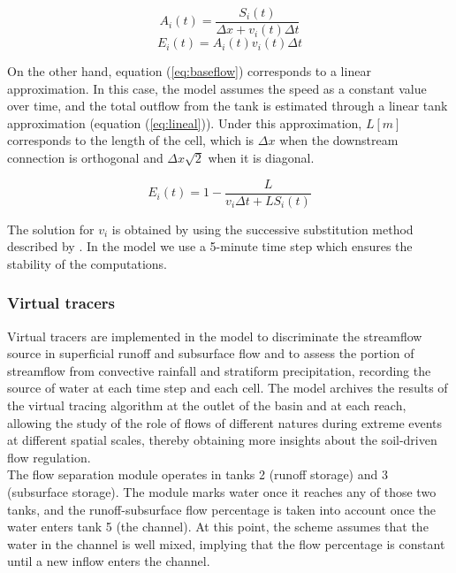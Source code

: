 \documentclass[hess, manuscript]{copernicus}
\begin{document}
\begin{equation}
 A_i(t) = \frac{S_{i}(t)}{\Delta x + v_{i}(t) \Delta t}
    \label{eq:balance}
\end{equation}
\begin{equation}
    E_{i}(t) =  A_{i}(t) v_{i}(t) \Delta t
     \label{eq:volSalida}
\end{equation}

On the other hand, equation (\ref{eq:baseflow}) corresponds to a linear approximation.  In this case, the model assumes the speed as a constant value over time, and the total outflow from the tank is estimated through a linear tank approximation (equation (\ref{eq:lineal})). Under this approximation, $L [m]$ corresponds to the length of the cell, which is $\Delta x$ when the downstream connection is orthogonal and $\Delta x \sqrt{2}$ when it is diagonal.

\begin{equation}
    E_{i}(t) = 1 - \frac{L}{v_{i}\Delta t + L S_{i}(t)}
    \label{eq:lineal}
\end{equation}

The solution for $v_{i}$ is obtained by using the successive substitution method described by \citet{Chapra2012}. In the model we use a  5-minute time step which ensures the stability of the computations. 

\subsubsection{Virtual tracers}

Virtual tracers are implemented in the model to discriminate the streamflow source in superficial runoff and subsurface flow and to assess the portion of streamflow from convective rainfall and stratiform precipitation, recording the source of water at each time step and each cell.  The model archives the results of the virtual tracing algorithm at the outlet of the basin and at each reach, allowing the study of the role of flows of different natures during extreme events at different spatial scales, thereby obtaining more insights about the soil-driven flow regulation. \\

The flow separation module operates in tanks 2 (runoff storage) and 3 (subsurface storage). The module marks water once it reaches any of those two tanks, and the runoff-subsurface flow percentage is taken into account once the water enters tank 5 (the channel). At this point, the scheme assumes that the water in the channel is well mixed,  implying that the flow percentage is constant until a new inflow enters the channel.\\
\end{document}
